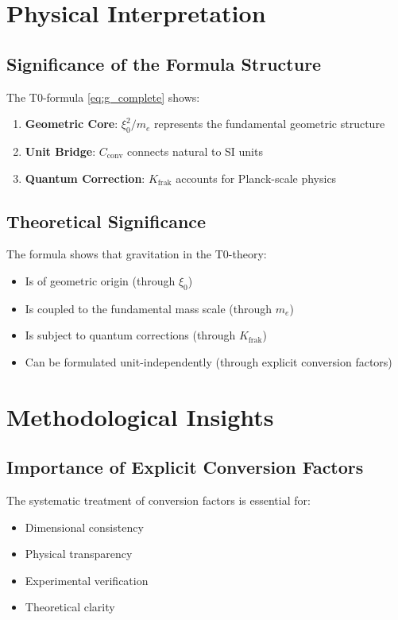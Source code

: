 \documentclass[12pt,a4paper]{article}
\newcommand{\Kfrak}{K_{\text{frak}}}
\newcommand{\Cconv}{C_{\text{conv}}}
\begin{document}
	\section{Physical Interpretation}
	
	\subsection{Significance of the Formula Structure}
	
	The T0-formula \eqref{eq:g_complete} shows:
	
	\begin{enumerate}
		\item \textbf{Geometric Core}: $\xi_0^2/m_e$ represents the fundamental geometric structure
		\item \textbf{Unit Bridge}: $\Cconv$ connects natural to SI units
		\item \textbf{Quantum Correction}: $\Kfrak$ accounts for Planck-scale physics
	\end{enumerate}
	
	\subsection{Theoretical Significance}
	
	The formula shows that gravitation in the T0-theory:
	\begin{itemize}
		\item Is of geometric origin (through $\xi_0$)
		\item Is coupled to the fundamental mass scale (through $m_e$)
		\item Is subject to quantum corrections (through $\Kfrak$)
		\item Can be formulated unit-independently (through explicit conversion factors)
	\end{itemize}
	
	\section{Methodological Insights}
	
	\subsection{Importance of Explicit Conversion Factors}
	
	\begin{keyresult}
		The systematic treatment of conversion factors is essential for:
		\begin{itemize}
			\item Dimensional consistency
			\item Physical transparency
			\item Experimental verification
			\item Theoretical clarity
		\end{itemize}
	\end{keyresult}
	
\end{document}
